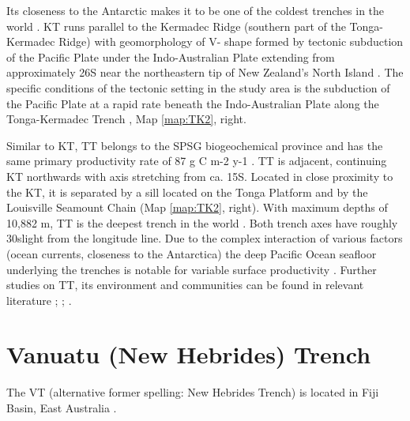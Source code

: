 \documentclass[11pt,a4paper]{report}
\begin{document}
Its closeness to the Antarctic makes it to be one of the coldest trenches in the world \cite{Belyaev}. \ac{KT} runs parallel to the Kermadec Ridge (southern part of the Tonga-Kermadec Ridge) with geomorphology of V- shape formed by tectonic subduction of the Pacific Plate under the Indo-Australian Plate extending from approximately 26\degree\space S near the northeastern tip of New Zealand's North Island \cite{LeducRowden2018}. The specific conditions of the tectonic setting in the study area is the subduction of the Pacific Plate at a rapid rate beneath the Indo-Australian Plate along the Tonga-Kermadec Trench \cite{Castilloetal2009}, Map \ref{map:TK2}, right. 

Similar to \ac{KT}, \ac{TT} belongs to the \ac{SPSG} biogeochemical province and has the same primary productivity rate of 87 g C m-2 y-1 \cite{Xuetal2018}. \ac{TT} is adjacent, continuing \ac{KT} northwards with axis stretching from ca. 15\degree\space S. Located in close proximity to the \ac{KT}, it is separated by a sill located on the Tonga Platform \cite{Wrightetal2000} and by the Louisville Seamount Chain \cite{Jamiesonetal2013} (Map \ref{map:TK2}, right). With maximum depths of 10,882 m, \ac{TT} is the  deepest trench in the world \cite{Blankenship}. Both trench axes have roughly 30\degree\space slight from the longitude line. Due to the complex interaction of various factors (ocean currents, closeness to the Antarctica) the deep Pacific Ocean seafloor underlying the trenches is notable for variable surface productivity \cite{Linleyetal2017}. Further studies on \ac{TT}, its environment and communities can be found in relevant literature \cite{Tappin}; \cite{Ewartetal1998}; \cite{Hergt}.

\pagebreak
\section{Vanuatu (New Hebrides) Trench}
The \ac{VT} (alternative former spelling: New Hebrides Trench) is located in Fiji Basin, East Australia \cite{Lemenkova202022}. 
\end{document}
